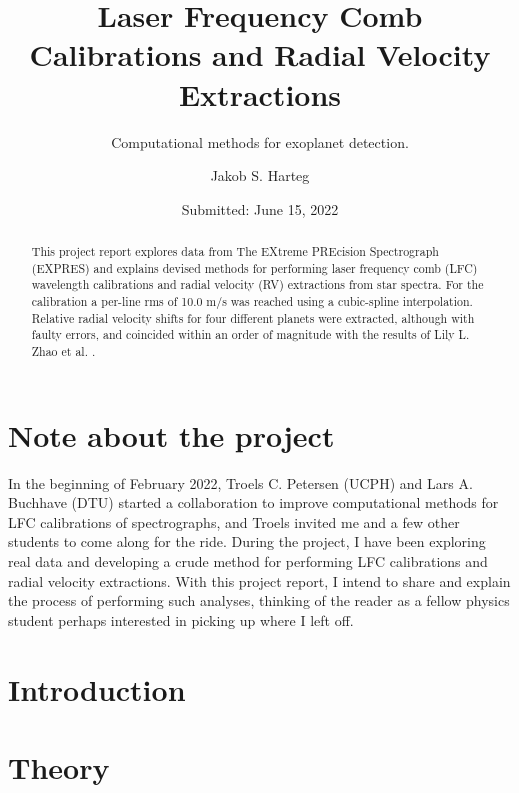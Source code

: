 \documentclass{article}
\author{Jakob S. Harteg}
\title{Laser Frequency Comb Calibrations and \newline Radial Velocity Extractions}
\subtitle{Computational methods for exoplanet detection.}
\date{Submitted: June 15, 2022}
\begin{document}
\begingroup
  \selectfont
  \maketitle
\endgroup


\newpage
\begin{abstract}
This project report explores data from The EXtreme PREcision Spectrograph (EXPRES) and explains devised methods for performing laser frequency comb (LFC) wavelength calibrations and radial velocity (RV) extractions from star spectra. For the calibration a per-line rms of 10.0 m/s was reached using a cubic-spline interpolation. Relative radial velocity shifts for four different planets were extracted, although with faulty errors, and coincided within an order of magnitude with the results of Lily L. Zhao et al. \cite{yale_data}. 
\end{abstract}

\newpage
\tableofcontents

\vspace{\fill}

\section*{Note about the project}
In the beginning of February 2022, Troels C. Petersen (UCPH) and Lars A. Buchhave (DTU) started a collaboration to improve computational methods for LFC calibrations of spectrographs, and Troels invited me and a few other students to come along for the ride. During the project, I have been exploring real data and developing a crude method for performing LFC calibrations and radial velocity extractions. With this project report, I intend to share and explain the process of performing such analyses, thinking of the reader as a fellow physics student perhaps interested in picking up where I left off. 


\newpage
\section{Introduction}
 

\section{Theory}
 
\end{document}
